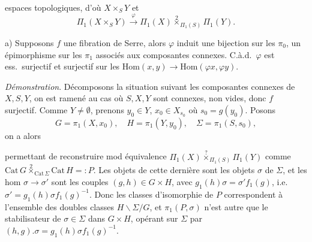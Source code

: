 \documentclass[11pt,a4paper]{article}
\begin{document}


espaces topologiques, d'où $X \times_S Y$ et
\[
  \Pi_1(X \times_S Y) \xrightarrow{\ \varphi\ } \Pi_1(X) \overset{2}{\times}_{\Pi_1(S)} \Pi_1(Y) .
\]

a) Supposons $f$ une fibration de Serre, alors $\varphi$ induit une bijection
sur les $\pi_0$, un épimorphisme sur les $\pi_1$ associés aux composantes
connexes. C.à.d.\ $\varphi$ est ess.\ surjectif et surjectif sur les
$\mathrm{Hom}(x, y) \to \mathrm{Hom}(\varphi x, \varphi y)$.

\emph{Démonstration}. Décomposons la situation suivant les composantes
connexes de $X, S, Y$, on est ramené au cas où $S, X, Y$ sont connexes,
non vides, \struck{\ill{}} donc $f$ surjectif. Comme $Y \neq \emptyset$,
prenons $y_0 \in Y$, $x_0 \in X_{s_0}$ où $s_0 = g(y_0)$. Posons
\[
  G = \pi_1(X, x_0), \quad H = \pi_1(Y, y_0), \quad \Sigma = \pi_1(S, s_0) ,
\]
on a alors


permettant de reconstruire mod équivalence
$\Pi_1(X) \overset{?}{\times}_{\Pi_1(S)} \Pi_1(Y)$ comme
$\mathrm{Cat}\, G \overset{2}{\times}_{\mathrm{Cat}\, \Sigma} \mathrm{Cat}\, H
=: P$. Les objets de cette dernière sont les objets $\sigma$ de $\Sigma$, et
les hom $\sigma \to \sigma'$ sont les couples $(g, h) \in G \times H$, avec
$g_1(h) \sigma = \sigma' f_1(g)$, i.e.\ $\sigma' = g_1(h) \sigma f_1(g)^{-1}$.
Donc les classes d'isomorphie de $P$ correspondent à l'ensemble des doubles
classes $H \backslash \Sigma / G$, et 
$\pi_1(P, \sigma)$ n'est autre que \struck{\ill{}} le stabilisateur de
$\sigma \in \Sigma$ dans $G \times H$, opérant sur $\Sigma$ par
$(h, g) . \sigma = g_1(h) \sigma f_1(g)^{-1}$.
\end{document}
